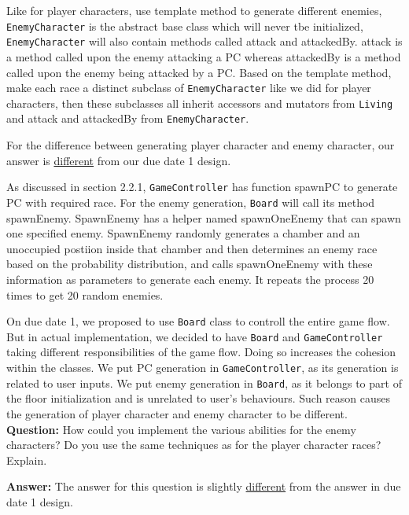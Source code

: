 \documentclass[11pt]{article}
\theoremstyle{plain} \newtheorem{theorem*}{Theorem}[subsection]
\begin{document}
Like for player characters, use template method to generate different enemies,
\texttt{EnemyCharacter} is the abstract base class which will
never tbe initialized, \texttt{EnemyCharacter} will also contain methods called
\textsf{attack} and \textsf{attackedBy}. 
\textsf{attack} is a method called upon the enemy attacking a PC whereas
\textsf{attackedBy} is a method called upon the enemy being attacked by a PC. 
Based on the template method, make each race a 
distinct subclass of \texttt{EnemyCharacter} like we did for player characters,
then these subclasses all inherit accessors and
mutators from \texttt{Living} and \textsf{attack} and \textsf{attackedBy}
from \texttt{EnemyCharacter}.


For the difference between generating player character and enemy character,
our answer is \underline{different} from our due date 1 design. 

As discussed in section 2.2.1, 
\texttt{GameController} has function \textsf{spawnPC} to generate PC with 
required race. For the enemy generation, \texttt{Board} will call its method
\textsf{spawnEnemy}. \textsf{SpawnEnemy} 
has a helper named \textsf{spawnOneEnemy} that can spawn one specified enemy. 
\textsf{SpawnEnemy} randomly generates a chamber and an unoccupied postiion
inside that chamber and then determines an enemy race based on the probability 
distribution, and calls \textsf{spawnOneEnemy} with these information as
parameters to generate each enemy.
It repeats the process 20 times to get 20 random enemies. 

On due date 1, we proposed to use \texttt{Board} class to controll the entire 
game flow. But in actual implementation, we decided to have \texttt{Board} 
and \texttt{GameController} taking different responsibilities of the game flow. 
Doing so increases the cohesion within the classes. We put PC generation in 
\texttt{GameController}, as its generation is related to user inputs. We put 
enemy generation in \texttt{Board}, as it belongs to part of the floor 
initialization and is unrelated to user’s behaviours. Such reason causes the 
generation of player character and enemy character to be different. \\

\textbf{Question:}
How could you implement the various abilities for the enemy characters? Do you
use the same techniques as for the player character races? Explain. 

\textbf{Answer:}
The answer for this question is slightly \underline{different} from the answer 
in due date 1 design. 
\end{document}
